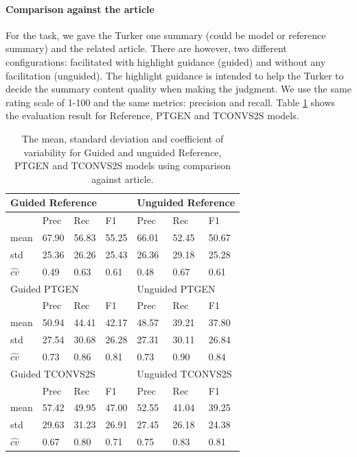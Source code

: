 \documentclass[11pt,a4paper]{article}
\begin{document}
\paragraph{Comparison against the article} For the task, we gave the Turker one summary (could be model or reference summary) and the related article. There are however, two different configurations: facilitated with highlight guidance (guided) and without any facilitation (unguided). The highlight guidance is intended to help the Turker to decide the summary content quality when making the judgment. We use the same rating scale of 1-100 and the same metrics: precision and recall. Table \ref{table:articlesummresult} shows the evaluation result for Reference, PTGEN and TCONVS2S models.

\begin{table}[]
  \small
  \begin{tabular}{p{0.5cm}p{0.6cm}p{0.6cm}p{0.6cm}|p{0.6cm}p{0.6cm}p{0.6cm}}
    \hline
  \multicolumn{4}{l}{Guided Reference} & \multicolumn{3}{l}{Unguided Reference} \\
  \hline
        & Prec  & Rec  & F1    & Prec  & Rec  & F1         \\
  mean  & 67.90      & 56.83   & 55.25 & 66.01         & 52.45      & 50.67     \\
  std   & 25.36      & 26.26   & 25.43 & 26.36         & 29.18      & 25.28     \\
  $\hat{cv}$    & 0.49       & 0.63    & 0.61  & 0.48          & 0.67       & 0.61      \\
  \hline
  \multicolumn{4}{l}{Guided PTGEN}     & \multicolumn{3}{l}{Unguided PTGEN}     \\
  \hline
        & Prec  & Rec  & F1     & Prec  & Rec  & F1         \\
  mean  & 50.94      & 44.41   & 42.17 & 48.57         & 39.21      & 37.80     \\
  std   & 27.54      & 30.68   & 26.28 & 27.31         & 30.11      & 26.84     \\
  $\hat{cv}$    & 0.73       & 0.86    & 0.81  & 0.73          & 0.90       & 0.84      \\
  \hline
  \multicolumn{4}{l}{Guided TCONVS2S}  & \multicolumn{3}{l}{Unguided TCONVS2S}  \\
  \hline
        & Prec  & Rec  & F1     & Prec  & Rec  & F1            \\
  mean  & 57.42      & 49.95   & 47.00 & 52.55         & 41.04      & 39.25     \\
  std   & 29.63      & 31.23   & 26.91 & 27.45         & 26.18      & 24.38     \\
  $\hat{cv}$    & 0.67       & 0.80    & 0.71  & 0.75          & 0.83       & 0.81     
  \end{tabular}
  \caption{The mean, standard deviation and coefficient of variability for Guided and unguided Reference, PTGEN and TCONVS2S models using comparison against article.}
\label{table:articlesummresult}
  \end{table}
\end{document}
